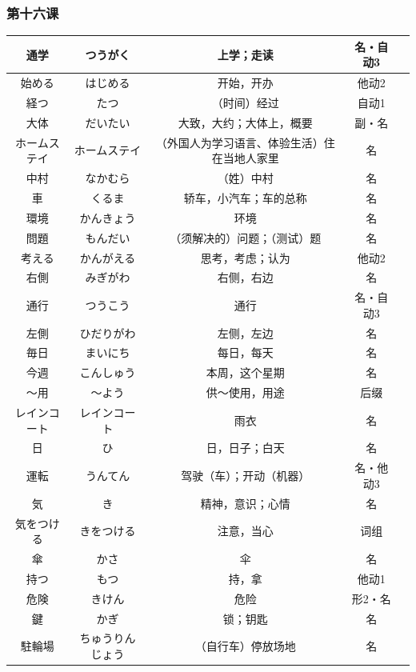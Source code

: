 \subsubsection{第十六课}
\begin{longtable}{|c|c|c|c|c|}
    \hline
通学 & つうがく & 上学；走读 & 名・自动3 & \\ \hline
始める & はじめる & 开始，开办 & 他动2 & \\ \hline
経つ & たつ & （时间）经过 & 自动1 & \\ \hline
大体 & だいたい & 大致，大约；大体上，概要 & 副・名 & \\ \hline
ホームステイ & ホームステイ & （外国人为学习语言、体验生活）住在当地人家里 & 名 & \\ \hline
中村 & なかむら & （姓）中村 & 名 & \\ \hline
車 & くるま & 轿车，小汽车；车的总称 & 名 & \\ \hline
環境 & かんきょう & 环境 & 名 & \\ \hline
問題 & もんだい & （须解决的）问题；（测试）题 & 名 & \\ \hline
考える & かんがえる & 思考，考虑；认为 & 他动2 & \\ \hline
右側 & みぎがわ & 右侧，右边 & 名 & \\ \hline
通行 & つうこう & 通行 & 名・自动3 & \\ \hline
左側 & ひだりがわ & 左侧，左边 & 名 & \\ \hline
毎日 & まいにち & 每日，每天 & 名 & \\ \hline
今週 & こんしゅう & 本周，这个星期 & 名 & \\ \hline
〜用 & 〜よう & 供〜使用，用途 & 后缀 & \\ \hline
レインコート & レインコート & 雨衣 & 名 & \\ \hline
日 & ひ & 日，日子；白天 & 名 & \\ \hline
運転 & うんてん & 驾驶（车）；开动（机器） & 名・他动3 & \\ \hline
気 & き & 精神，意识；心情 & 名 & \\ \hline
気をつける & きをつける & 注意，当心 & 词组 & \\ \hline
傘 & かさ & 伞 & 名 & \\ \hline
持つ & もつ & 持，拿 & 他动1 & \\ \hline
危険 & きけん & 危险 & 形2・名 & \\ \hline
鍵 & かぎ & 锁；钥匙 & 名 & \\ \hline
駐輪場 & ちゅうりんじょう & （自行车）停放场地 & 名 & \\ \hline

\end{longtable}
